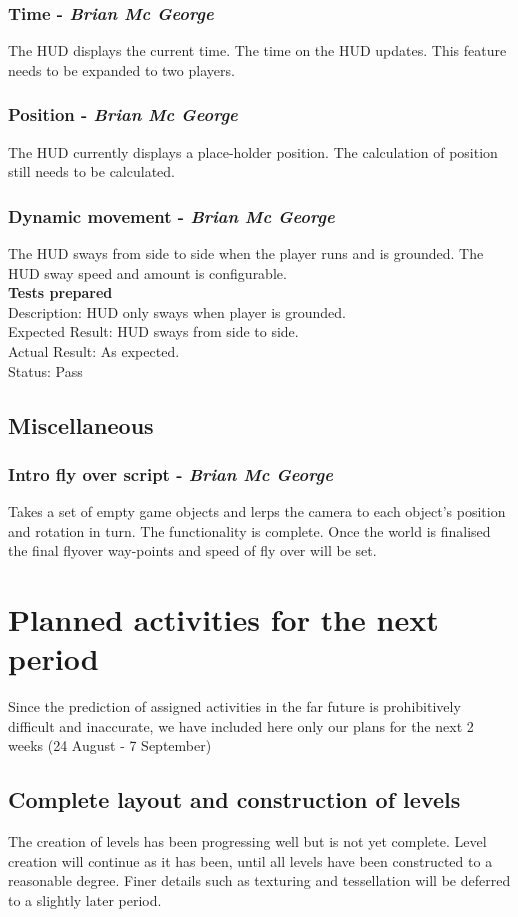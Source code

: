 \documentclass[a4paper,10pt]{article}
\begin{document}
\subsubsection{Time - \textit{Brian Mc George}}
The HUD displays the current time. The time on the HUD updates. This feature needs to be expanded to two players.
\subsubsection{Position - \textit{Brian Mc George}}
The HUD currently displays a place-holder position. The calculation of position still needs to be calculated.
\subsubsection{Dynamic movement - \textit{Brian Mc George}}
The HUD sways from side to side when the player runs and is grounded. The HUD sway speed and amount is configurable.
\smallskip\\\textbf{Tests prepared}\\
Description: HUD only sways when player is grounded.\\
Expected Result: HUD sways from side to side.\\
Actual Result: As expected.\\
Status: Pass

\subsection{Miscellaneous}
\subsubsection{Intro fly over script - \textit{Brian Mc George}}
Takes a set of empty game objects and lerps the camera to each object's position and rotation in turn. The functionality is complete. Once the world is finalised the final flyover way-points and speed of fly over will be set.

\section{Planned activities for the next period}
Since the prediction of assigned activities in the far future is prohibitively difficult and inaccurate, we have included here only our plans for the next 2 weeks (24 August - 7 September)
\subsection{Complete layout and construction of levels}
The creation of levels has been progressing well but is not yet complete. Level creation will continue as it has been, until all levels have been constructed to a reasonable degree. Finer details such as texturing and tessellation will be deferred to a slightly later period. 
\end{document}
